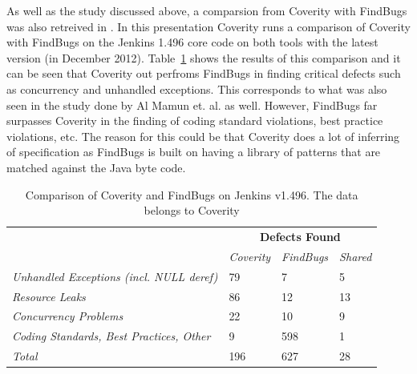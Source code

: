 \documentclass[10pt,oneside]{IEEEtran}
\begin{document}
As well as the study discussed above, a comparsion from Coverity with FindBugs was also retreived in \cite{12}. In this presentation Coverity runs a comparison of Coverity with FindBugs on the Jenkins 1.496 core code on both tools with the latest version (in December 2012). Table~\ref{tbl:coverityCompare} shows the results of this comparison and it can be seen that Coverity out perfroms FindBugs in finding critical defects such as concurrency and unhandled exceptions. This corresponds to what was also seen in the study done by Al Mamun et. al. as well. However, FindBugs far surpasses Coverity in the finding of coding standard violations, best practice violations, etc. The reason for this could be that Coverity does a lot of inferring of specification as FindBugs is built on having a library of patterns that are matched against the Java byte code.

\begin{table}[ht]
\centering
\caption{Comparison of Coverity and FindBugs on Jenkins v1.496. The data belongs to Coverity}
\label{tbl:coverityCompare}
\begin{tabular}{@{}llll@{}}
\toprule
\multirow{2}{*}{}                                                  & \multicolumn{3}{c}{{\bf Defects Found}}        \\ \cmidrule(l){2-4}
                                                                   & {\it Coverity} & {\it FindBugs} & {\it Shared} \\ \midrule
\multicolumn{1}{l|}{{\it Unhandled Exceptions (incl. NULL deref)}} & 79             & 7              & 5            \\ \midrule
\multicolumn{1}{l|}{{\it Resource Leaks}}                          & 86             & 12             & 13           \\ \midrule
\multicolumn{1}{l|}{{\it Concurrency Problems}}                    & 22             & 10             & 9            \\ \midrule
\multicolumn{1}{l|}{{\it Coding Standards, Best Practices, Other}} & 9              & 598            & 1            \\ \midrule
{\it Total}                                                        & 196            & 627            & 28           \\ \bottomrule
\end{tabular}
\end{table}
\end{document}
